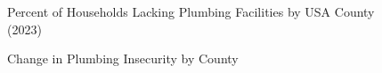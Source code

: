 \documentclass[
  letterpaper,
  DIV=11,
  numbers=noendperiod]{scrartcl}
\begin{document}
\begin{figure}[H]


\caption{\label{fig-2}Percent of Households Lacking Plumbing Facilities
by USA County (2023)}

\end{figure}%

\begin{figure}[H]


\caption{\label{fig-3}Change in Plumbing Insecurity by County}

\end{figure}%
\end{document}
